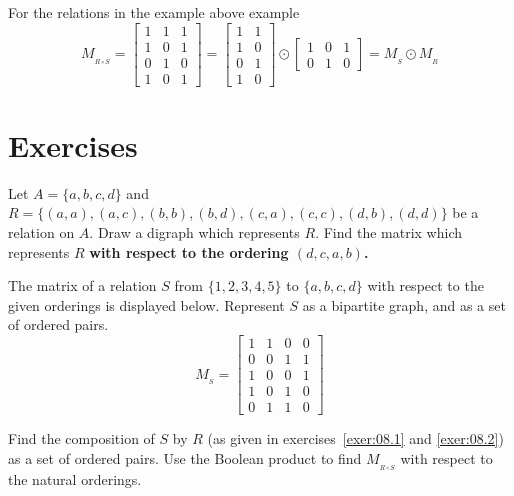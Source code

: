 For the relations in the example above example
\[
M_{_{R\circ S}}=
  \left[ \begin{matrix} 1&1&1\\ 1&0&1\\ 0&1&0\\ 1&0&1 \end{matrix} \right]
   =
  \left[\begin{matrix} 1&1\\ 1&0\\ 0&1\\ 1&0 \end{matrix}\right]\odot 
    \left[\begin{matrix} 1&0&1\\ 0&1&0 \end{matrix}\right]=M_{_S}\odot M_{_R} %
\]

\clearpage

\section{Exercises}

\begin{exer}\label{exer:08.1}
 Let $A=\{a,b,c,d\}$ and \newline
 $R=\{(a,a),(a,c),(b,b),(b,d),(c,a),(c,c),(d,b),(d,d)\}$ be a relation on $A$.
 Draw a digraph which represents $R$. Find the matrix which represents $R$ 
{\bfseries {with respect to the ordering $(d,c,a,b)$.}}
\end{exer}

\begin{exer}\label{exer:08.2}
The matrix of a relation $S$ from $\{1,2,3,4,5\}$ to $\{a,b,c,d\}$ with respect to the given
orderings is displayed below. Represent $S$ as a bipartite graph, and as a set of ordered pairs.
\[
 M_{_S}=\left[\begin{matrix} 1&1&0&0\\ 0&0&1&1\\ 1&0&0&1\\ 1&0&1&0\\ 0&1&1&0 \end{matrix}\right]
\]
\end{exer}

\begin{exer} 
Find the composition of $S$ by $R$ (as given in exercises~\ref{exer:08.1} 
and \ref{exer:08.2}) as a set of ordered pairs. 
Use the Boolean product to find $M_{_{R\circ S}}$ with respect to the natural orderings.
\end{exer}


